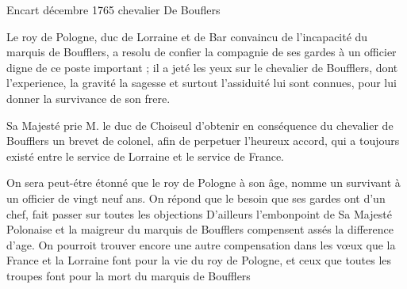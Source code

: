                      \begin{diary}{Encart}{}
                              décembre 1765
                              chevalier De Bouflers
                           \bigskip


                              Le roy de Pologne, duc de
                              Lorraine et de
                              Bar convaincu de l'incapacité du marquis
                                 de Boufflers, a resolu de confier la compagnie
                                 de ses gardes à un officier digne de ce poste
                              important ; il a jeté les yeux sur le chevalier de
                                 Boufflers, dont l'experience, la gravité
                              la sagesse et surtout l'assiduité lui sont
                              connues, pour lui donner la survivance de
                              son frere. \bigskip


                              Sa Majesté prie M. le duc de Choiseul
                              d'obtenir en conséquence du
                                 chevalier de
                                 Boufflers un brevet de colonel, afin de
                              perpetuer l'heureux accord, qui a toujours
                              existé entre le service de Lorraine et le
                              service de France. \bigskip

         On sera peut-étre étonné que le
                                 roy de
                                 Pologne à son âge, nomme un survivant
                              à un officier de vingt neuf ans. On répond
                              que le besoin que ses gardes ont d'un
                              chef, fait passer sur toutes les objections D'ailleurs
                              l'embonpoint de Sa Majesté
                                 Polonaise et la maigreur du marquis de
                                 Boufflers compensent assés la difference
                              d'age. On pourroit trouver encore une
                              autre compensation dans les vœux que la
                                 France et la
                                 Lorraine font pour la vie
                              du roy de Pologne, et
                              ceux que toutes
                              les troupes font pour la mort du
                                 marquis
                                 de Boufflers
                           \bigskip



\end{diary}

